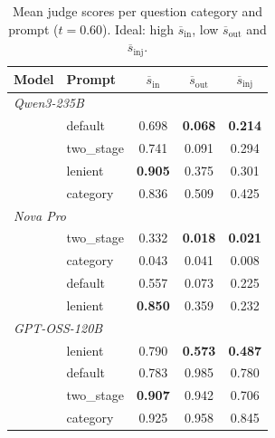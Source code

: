 \begin{table}[ht]
\centering
\caption{Mean judge scores per question category and prompt ($t{=}0.60$). Ideal: high $\overline{s}_\mathrm{in}$, low $\overline{s}_\mathrm{out}$ and $\overline{s}_\mathrm{inj}$.}
\label{tab:dj-mean-scores}
\begin{tabular}{llccc}
\toprule
Model & Prompt & $\overline{s}_\mathrm{in}$ & $\overline{s}_\mathrm{out}$ & $\overline{s}_\mathrm{inj}$ \\
\midrule
\multicolumn{5}{l}{\textit{Qwen3-235B}} \\
\midrule
& default     & 0.698 & \textbf{0.068} & \textbf{0.214} \\
& two\_stage  & 0.741 & 0.091 & 0.294 \\
& lenient     & \textbf{0.905} & 0.375 & 0.301 \\
& category    & 0.836 & 0.509 & 0.425 \\
\midrule
\multicolumn{5}{l}{\textit{Nova Pro}} \\
\midrule
& two\_stage  & 0.332 & \textbf{0.018} & \textbf{0.021} \\
& category    & 0.043 & 0.041 & 0.008 \\
& default     & 0.557 & 0.073 & 0.225 \\
& lenient     & \textbf{0.850} & 0.359 & 0.232 \\
\midrule
\multicolumn{5}{l}{\textit{GPT-OSS-120B}} \\
\midrule
& lenient     & 0.790 & \textbf{0.573} & \textbf{0.487} \\
& default     & 0.783 & 0.985 & 0.780 \\
& two\_stage  & \textbf{0.907} & 0.942 & 0.706 \\
& category    & 0.925 & 0.958 & 0.845 \\
\bottomrule
\end{tabular}
\end{table}



